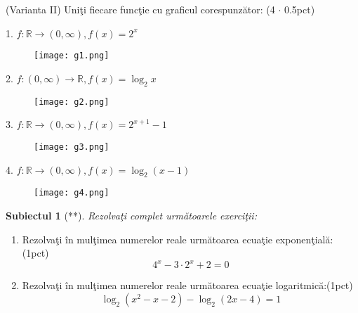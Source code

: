 \documentclass[a4paper, 12pt]{scrartcl}
\theoremstyle{plain}
\newtheorem{subiect}{Subiectul}
\newcommand{\Subiect}[2]{
    {
        \large
        \begin{subiect}[#2]
            #1
        \end{subiect}
    }
}
\begin{document}
\newpage
\noindent (Varianta II) Uni\c ti fiecare func\c tie cu graficul corespunz\u ator: (4 \(\cdot\) 0.5pct) \hfill


\begin{paracol}{2}
    \noindent
    \vfill
    1. \( f: \mathbb{R} \rightarrow ( 0, \infty ),  f(x) = 2^x \)
    \vfill
    \switchcolumn
    \begin{figure}
        \texttt{[image: g1.png]}
    \end{figure}
\end{paracol}

\begin{paracol}{2}
    \noindent
    \vfill
    2. \( f: ( 0, \infty ) \rightarrow \mathbb{R}, f(x) = \log_2{x} \)
    \vfill
    \switchcolumn
    \begin{figure}
        \texttt{[image: g2.png]}
    \end{figure}
\end{paracol}
    
\begin{paracol}{2}
    \noindent
    \vfill
    3. \( f: \mathbb{R} \rightarrow ( 0, \infty ), f(x) = 2^{x+1} - 1 \)
    \vfill
    \switchcolumn
    \begin{figure}
        \texttt{[image: g3.png]}
    \end{figure}
\end{paracol}
\vspace{-0.4cm}
\begin{paracol}{2}
    \noindent
    \vfill
    4. \( f: \mathbb{R} \rightarrow ( 0, \infty ), f(x) = \log_2({x - 1}) \)
    \vfill
    \switchcolumn
    \begin{figure}[h]
        \texttt{[image: g4.png]}
    \end{figure}
\end{paracol}

\newpage

\Subiect{Rezolva\c ti complet urm\u atoarele exerci\c tii: }{**}

\begin{enumerate}[label=\textbf{\arabic*})]
    \item {
        Rezolva\c ti \^in mul\c timea numerelor reale urm\u atoarea ecua\c tie exponen\c tial\u a:\hfill (1pct)
        \[
            4^x - 3 \cdot 2^x + 2 = 0
        \]    
    }
    \item {
        Rezolva\c ti \^in mul\c timea numerelor reale urm\u atoarea ecua\c tie logaritmic\u a:\hfill (1pct)
        \[
            \log_2 (x^2 - x - 2) - \log_2 (2x - 4) = 1
        \]    
    }
\end{enumerate}
\end{document}
